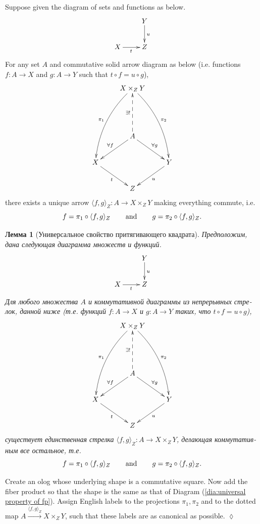 \documentclass[a4paper]{book}
\def\hsp{\hspace{.3in}}
\def\to{\rightarrow}
\def\taking{\colon}
\def\la{\langle}
\def\ra{\rangle}
\newcommand{\To}[1]{\xrightarrow{#1}}
\newcommand{\prodmap}[2]{\la#1,#2\ra}
\newcommand{\pb}[3]{\prodmap{#1}{#2}_{#3}}
\theoremstyle{myth}
\newtheorem{lemmaENG}[envENG]{\begin{english}Lemma\end{english}}
\newtheorem{excENG}[envENG]{\begin{english}Exercise\end{english}}
\newenvironment{exerciseENG}{\begin{excENG}}{\hspace*{\fill}$\lozenge$\end{excENG}}
\newtheorem{lemmaRUS}[envRUS]{Лемма}
\begin{document}
\begin{russian}
\begin{lemmaENG}\label{lemma:up for fp}
Suppose given the diagram of sets and functions as below.
\begin{align*}
\xymatrix{&Y\ar[d]^u\\
X\ar[r]_t&Z}
\end{align*}
For any set $A$ and commutative solid arrow diagram as below (i.e. functions $f\taking A\to X$ and $g\taking A\to Y$ such that $t\circ f=u\circ g$), 
\begin{align}\label{dia:universal property of fp}
\xymatrix{
&X\times_ZY\ar@/_1pc/[lddd]_{\pi_1}\ar@/^1pc/[rddd]^{\pi_2}\\\\
&A\ar@{-->}[uu]^{\exists!}\ar[dl]_{\forall f}\ar[dr]^{\forall g}&\\
X\ar[rd]_t&&Y\ar[ld]^u\\
&Z&}
\end{align}
there exists a unique arrow $\pb{f}{g}{Z}\taking A\to X\times_ZY$ making everything commute, i.e. 
$$f=\pi_1\circ \pb{f}{g}{Z}\hsp\text{and}\hsp g=\pi_2\circ\pb{f}{g}{Z}.$$
\end{lemmaENG}

\begin{lemmaRUS}[Универсальное свойство притягивающего квадрата]\label{lemma:up for fp}
Предположим, дана следующая диаграмма множеств и функций.
\begin{align*}
\xymatrix{&Y\ar[d]^u\\
X\ar[r]_t&Z}
\end{align*}
Для любого множества $A$ и коммутативной диаграммы из непрерывных стрелок, данной ниже (т.е. функций $f\taking A\to X$ и $g\taking A\to Y$ таких, что $t\circ f=u\circ g$), 
\begin{align}\label{dia:universal property of fp}
\xymatrix{
&X\times_ZY\ar@/_1pc/[lddd]_{\pi_1}\ar@/^1pc/[rddd]^{\pi_2}\\\\
&A\ar@{-->}[uu]^{\exists!}\ar[dl]_{\forall f}\ar[dr]^{\forall g}&\\
X\ar[rd]_t&&Y\ar[ld]^u\\
&Z&}
\end{align}
существует единственная стрелка $\pb{f}{g}{Z}\taking A\to X\times_ZY$, делающая коммутативным все остальное, т.е.
$$f=\pi_1\circ \pb{f}{g}{Z}\hsp\text{and}\hsp g=\pi_2\circ\pb{f}{g}{Z}.$$
\end{lemmaRUS}

\begin{exerciseENG}
Create an olog whose underlying shape is a commutative square. Now add the fiber product so that the shape is the same as that of Diagram (\ref{dia:universal property of fp}). Assign English labels to the projections $\pi_1,\pi_2$ and to the dotted map $A\To{\pb{f}{g}{Z}}X\times_ZY$, such that these labels are as canonical as possible.
\end{exerciseENG}


\end{russian}
\end{document}
